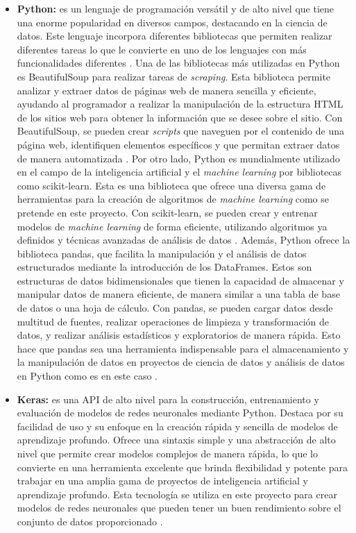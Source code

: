 \begin{itemize}
  \item \textbf{Python:}
   es un lenguaje de programación versátil y de alto nivel que tiene una enorme popularidad en diversos campos, destacando en la ciencia de datos. Este lenguaje incorpora diferentes bibliotecas que permiten realizar diferentes tareas lo que le convierte en uno de los lenguajes con más funcionalidades diferentes \cite{python}. Una de las bibliotecas más utilizadas en Python es BeautifulSoup para realizar tareas de \textit{scraping}. Esta biblioteca permite analizar y extraer datos de páginas web de manera sencilla y eficiente, ayudando al programador a realizar la manipulación de la estructura HTML de los sitios web para obtener la información que se desee sobre el sitio. Con BeautifulSoup, se pueden crear \textit{scripts} que naveguen por el contenido de una página web, identifiquen elementos específicos y que permitan extraer datos de manera automatizada \cite{beautifulsoup}. Por otro lado, Python es mundialmente utilizado en el campo de la inteligencia artificial y el \textit{machine learning} por bibliotecas como scikit-learn. Esta es una biblioteca que ofrece una diversa gama de herramientas para la creación de algoritmos de \textit{machine learning} como se pretende en este proyecto. Con scikit-learn, se pueden crear y entrenar modelos de \textit{machine learning} de forma eficiente, utilizando algoritmos ya definidos y técnicas avanzadas de análisis de datos \cite{scikit}. Además, Python ofrece la biblioteca pandas, que facilita la manipulación y el análisis de datos estructurados mediante la introducción de los DataFrames. Estos son estructuras de datos bidimensionales que tienen la capacidad de almacenar y manipular datos de manera eficiente, de manera similar a una tabla de base de datos o una hoja de cálculo. Con pandas, se pueden cargar datos desde multitud de fuentes, realizar operaciones de limpieza y transformación de datos, y realizar análisis estadísticos y exploratorios de manera rápida. Esto hace que pandas sea una herramienta indispensable para el almacenamiento y la manipulación de datos en proyectos de ciencia de datos y análisis de datos en Python como es en este caso \cite{pandas}.
  
  \item \textbf{Keras:}
  es una API de alto nivel para la construcción, entrenamiento y evaluación de modelos de redes neuronales mediante Python. Destaca por su facilidad de uso y su enfoque en la creación rápida y sencilla de modelos de aprendizaje profundo. Ofrece una sintaxis simple y una abstracción de alto nivel que permite crear modelos complejos de manera rápida, lo que lo convierte en una herramienta excelente que brinda flexibilidad y potente para trabajar en una amplia gama de proyectos de inteligencia artificial y aprendizaje profundo. Esta tecnología se utiliza en este proyecto para crear modelos de redes neuronales que pueden tener un buen rendimiento sobre el conjunto de datos proporcionado \cite{keras}.


\end{itemize}
